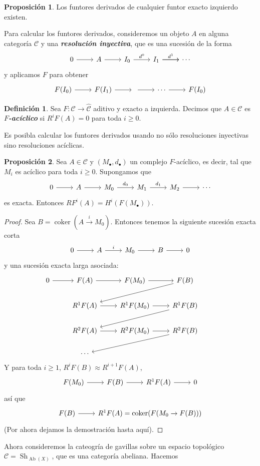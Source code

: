 \documentclass[spanish]{book}
\theoremstyle{definition}
\newtheorem*{defn}{Definición}
\newtheorem*{prop}{Proposición}
\DeclareMathOperator{\coker}{coker}
\begin{document}
\begin{prop}
	Los funtores derivados de cualquier funtor exacto izquierdo existen.
\end{prop}
Para calcular los funtores derivados, consideremos un objeto $A$ en alguna categoría $\mathcal{C}$ y una \textbf{\textit{resolución inyectiva}}, que es una sucesión de la forma
\[\begin{tikzcd}
	0\arrow[r]&A\arrow[r]&I_0\arrow[r,"d^0"]&I_1\arrow[r,"d^1"]\arrow[r]&\cdots
\end{tikzcd}\]
y aplicamos $F$ para obtener
\[\begin{tikzcd}
	F(I_0)\arrow[r]&F(I_1)\arrow[r]&\arrow[r]&\cdots\arrow[r]&F(I_0)
\end{tikzcd}\]
\begin{defn}
	Sea $F:\mathcal{C}\to\hat{\mathcal{C}}$ aditivo y exacto a izquierda. Decimos que $A\in\mathcal{C}$ es \textbf{\textit{$F$-acíclico}} si $R^iF(A)=0$ para toda $i\geq0$.
\end{defn}
Es posibla calcular los funtores derivados usando no sólo resoluciones inyectivas sino resoluciones acíclicas.
\begin{prop}
	Sea $A\in\mathcal{C}$ y $(M_\bullet,d_\bullet)$ un complejo $F$-acíclico, es decir, tal que $M_i$ es acíclico para toda $i\geq0$. Supongamos que
	\[\begin{tikzcd}
		0\arrow[r]&A\arrow[r]&M_0\arrow[r,"d_0"]&M_1\arrow[r,"d_1"]&M_2\arrow[r]&\cdots
	\end{tikzcd}\]
	es exacta. Entonces $RF^i(A)=H^i(F(M_\bullet))$.
\end{prop}
\begin{proof}
	Sea $B=\coker(A\overset{i}{\to}M_0)$. Entonces tenemos la siguiente sucesión exacta corta
	\[\begin{tikzcd}
		0\arrow[r]&A\arrow[r,"i"]&M_0\arrow[r]&B\arrow[r]&0
	\end{tikzcd}\]
	y una sucesión exacta larga asociada:
\[\begin{tikzcd}
	0\arrow[r]&F(A)\arrow[r]&F(M_0)\arrow[r]&F(B)\arrow[dll]\\
	&R^1F(A)\arrow[r]&R^1F(M_0)\arrow[r]&R^1F(B)\arrow[dll]&\\&R^2F(A)\arrow[r]&R^2F(M_0)\arrow[r]&R^2F(B)\arrow[dll]&\\&\cdots
\end{tikzcd}\]
Y para toda $i\geq1$, $R^iF(B)\approx R^{i+1}F(A)$,
\[\begin{tikzcd}
	F(M_0)\arrow[r]&F(B)\arrow[r]&R^1F(A)\arrow[r]&0
\end{tikzcd}\]
así que
\[\begin{tikzcd}
	F(B)\arrow[r]&R^1F(A)=\coker(F(M_0\to F(B)))
\end{tikzcd}\]
(Por ahora dejamos la demostración hasta aquí).
\end{proof}
Ahora consideremos la cateogría de gavillas sobre un espacio topológico $\mathcal{C}=\operatorname{Sh}_{\operatorname{Ab}(X)}$, que es una categoría abeliana. Hacemos
\end{document}
